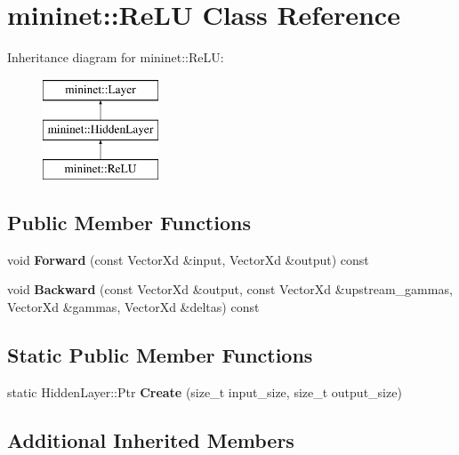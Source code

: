 \hypertarget{classmininet_1_1_re_l_u}{}\section{mininet\+:\+:Re\+LU Class Reference}
\label{classmininet_1_1_re_l_u}
Inheritance diagram for mininet\+:\+:Re\+LU\+:\begin{figure}[H]
\begin{center}
\leavevmode
\includegraphics[height=3.000000cm]{classmininet_1_1_re_l_u}
\end{center}
\end{figure}
\subsection*{Public Member Functions}
\begin{DoxyCompactItemize}
\item 
\hypertarget{classmininet_1_1_re_l_u_a735805e56b2d230e1b48ac0e02487c40}{}\label{classmininet_1_1_re_l_u_a735805e56b2d230e1b48ac0e02487c40} 
void {\bfseries Forward} (const Vector\+Xd \&input, Vector\+Xd \&output) const
\item 
\hypertarget{classmininet_1_1_re_l_u_a01bb8ec3b01d9f8dfb175c62490f109e}{}\label{classmininet_1_1_re_l_u_a01bb8ec3b01d9f8dfb175c62490f109e} 
void {\bfseries Backward} (const Vector\+Xd \&output, const Vector\+Xd \&upstream\+\_\+gammas, Vector\+Xd \&gammas, Vector\+Xd \&deltas) const
\end{DoxyCompactItemize}
\subsection*{Static Public Member Functions}
\begin{DoxyCompactItemize}
\item 
\hypertarget{classmininet_1_1_re_l_u_a97f47ae5a78501c180751747ca8fa0e3}{}\label{classmininet_1_1_re_l_u_a97f47ae5a78501c180751747ca8fa0e3} 
static Hidden\+Layer\+::\+Ptr {\bfseries Create} (size\+\_\+t input\+\_\+size, size\+\_\+t output\+\_\+size)
\end{DoxyCompactItemize}
\subsection*{Additional Inherited Members}


